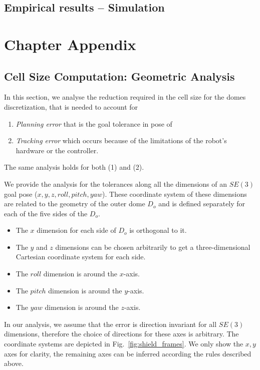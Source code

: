 \documentclass[a4paper]{report}
\begin{document}
\subsection{Empirical results -- Simulation}

\section{Chapter Appendix}
\subsection{Cell Size Computation: Geometric Analysis}
\label{sec:cell_size}
In this section, we analyse the reduction required in the cell size for the domes discretization, that is needed to account for

\begin{enumerate}
	\item \emph{Planning error} that is the goal tolerance in pose of \calS
	\item \emph{Tracking error} which occurs because of the limitations of the robot's hardware or the controller.
\end{enumerate}

The same analysis holds for both (1) and (2).

We provide the analysis for the tolerances along all the dimensions of an $SE(3)$ goal pose ($x,y,z,roll,pitch,yaw$). These coordinate system of these dimensions are related to the geometry of the outer dome $D_o$ and is defined separately for each of the five sides of the $D_o$.

\begin{itemize}
	\item The $x$ dimension for each side of $D_o$ is orthogonal to it.
	\item The $y$ and $z$ dimensions can be chosen arbitrarily to get a three-dimensional Cartesian coordinate system for each side.
	\item The $roll$ dimension is around the $x$-axis.
	\item The $pitch$ dimension is around the $y$-axis.
	\item The $yaw$ dimension is around the $z$-axis.
\end{itemize}

In our analysis, we assume that the error is direction invariant for all $SE(3)$ dimensions, therefore the choice of directions for these axes is arbitrary. The coordinate systems are depicted in Fig.~\ref{fig:shield_frames}. We only show the $x,y$ axes for clarity, the remaining axes can be inferred according the rules described above.
\end{document}
